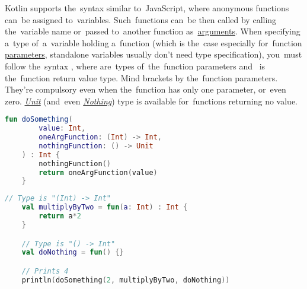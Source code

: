 Kotlin supports the~syntax similar to~JavaScript, where anonymous functions can~be assigned to~variables.
Such~functions can~be then called by calling the~variable name or~passed to~another function as~\hyperref[parameterargument]{arguments}.
When specifying a~type of~a~variable holding a~function (which is the~case especially for~function \hyperref[parameterargument]{parameters}, standalone variables usually don't need type specification), you~must follow the~syntax , where  are~types of~the~function parameters \mbox{and } is the~function return value type.
Mind brackets by the~function parameters.
They're compulsory even when the~function has only one parameter, or~even zero.
\hyperref[kotlinunit]{\textit{Unit}} (and~even \hyperref[kotlinnothing]{\textit{Nothing}}) type is available for~functions returning no value.

\example
\begin{lstlisting}[language=Kotlin, title={Function taking other functions as parameters}]
    fun doSomething(
        value: Int,
        oneArgFunction: (Int) -> Int,
        nothingFunction: () -> Unit
    ) : Int {
        nothingFunction()
        return oneArgFunction(value)
    }
\end{lstlisting}
\begin{lstlisting}[language=Kotlin, title={Usage}]
    // Type is "(Int) -> Int"
    val multiplyByTwo = fun(a: Int) : Int {
        return a*2
    }

    // Type is "() -> Int"
    val doNothing = fun() {}

    // Prints 4
    println(doSomething(2, multiplyByTwo, doNothing))
\end{lstlisting}
